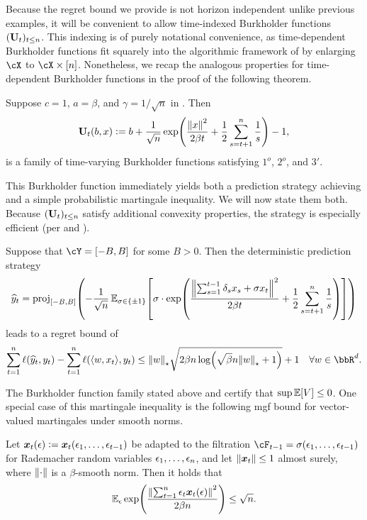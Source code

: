 Because the regret bound we provide is not horizon independent unlike previous examples, it will be convenient to allow time-indexed Burkholder functions $(\burk_{t})_{t\leq{}n}$. This indexing is of purely notational convenience, as time-dependent Burkholder functions fit squarely into the algorithmic framework of  by enlarging $\cX$ to $\cX\times{}\brk*{n}$. Nonetheless, we recap the analogous properties for time-dependent Burkholder functions in the proof of the following theorem.

\begin{theorem}
  \label{thm:param_free}
  Suppose $c=1$, $a=\beta$, and $\gamma=1/\sqrt{n}$ in . Then
  \[
    \burk_{t}(b, x) \ldef b + \frac{1}{\sqrt{n}}\exp\prn*{\frac{\nrm*{x}^{2}}{2\beta{}t} + \frac{1}{2}\sum_{s=t+1}^{n}\frac{1}{s}} - 1, 
  \]
  is a family of time-varying Burkholder functions satisfying $1^o$, $2^o$, and $3'$.
\end{theorem}

This Burkholder function immediately yields both a prediction strategy achieving  and a simple probabilistic martingale inequality. We will now state them both. Because $(\burk_t)_{t\leq{}n}$ satisfy additional convexity properties, the strategy is especially efficient (per  and ).

\begin{corollary}
Suppose that $\cY=\brk*{-B, B}$ for some $B>0$. Then the deterministic prediction strategy
  \[
    \yh_{t} = \mathrm{proj}_{\brk*{-B, B}}\prn*{-\frac{1}{\sqrt{n}}\En_{\sigma\in\pmo}\brk*{\sigma\cdot\exp\prn*{\frac{\nrm*{\sum_{s=1}^{t-1}\dl_{s}x_s + \sigma{}x_t}^{2}}{2\beta{}t} + \frac{1}{2}\sum_{s=t+1}^{n}\frac{1}{s}}}}
  \]
  leads to a regret bound of
  \[
    \sum_{t=1}^{n}\ls(\yh_t, y_t) - \sum_{t=1}^{n}\ls(\tri*{w,x_t}, y_t) \leq{} \nrm*{w}_{\star}\sqrt{2\beta{}n\log\prn*{\sqrt{\beta}n\nrm*{w}_{\star} + 1}} + 1 \quad\forall{}w\in\bbR^{d}.
  \]
\end{corollary}

The Burkholder function family stated above and  certify that $\sup\En\brk*{V}\leq{}0$. One special case of this martingale inequality is the following mgf bound for vector-valued martingales under smooth norms.

\begin{corollary}
  Let $\bx_{t}(\eps) \ldef \bx_{t}(\eps_1,\ldots,\eps_{t-1})$ be adapted to the filtration $\cF_{t-1}=\sigma(\eps_{1},\ldots,\eps_{t-1})$ for Rademacher random variables $\eps_{1},\ldots,\eps_{n}$, and let $\nrm*{\bx_t}\leq{}1$ almost surely, where $\nrm*{\cdot}$ is a $\beta$-smooth norm. Then it holds that
  \[
    \En_{\eps}\exp\prn*{\frac{\nrm*{\sum_{t=1}^{n}\eps_{t}\bx_{t}(\eps)}^{2}}{2\beta{}n}} \leq{} \sqrt{n}.
  \]

\end{corollary}

